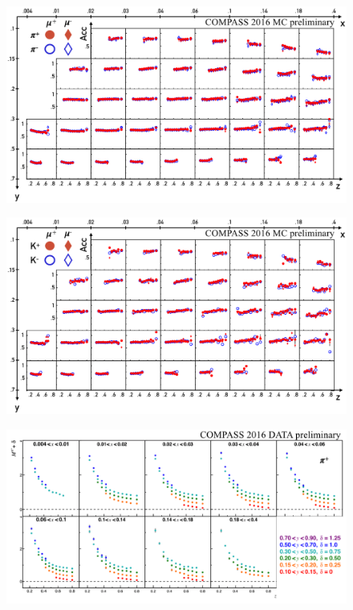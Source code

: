 \documentclass[letterpaper,12pt]{article}
\begin{document}
\begin{figure}
	\includegraphics[scale=0.5]{./gfx/AccPi.png}
	\caption{}
	\label{AccPi}
\end{figure}

\begin{figure}
	\includegraphics[scale=0.5]{./gfx/AccK.png}
	\caption{}
	\label{AccK}
\end{figure}

\begin{figure}
	\includegraphics[scale=0.5]{./gfx/Pip.png}
	\caption{}
	\label{Pip}
\end{figure}
\end{document}
